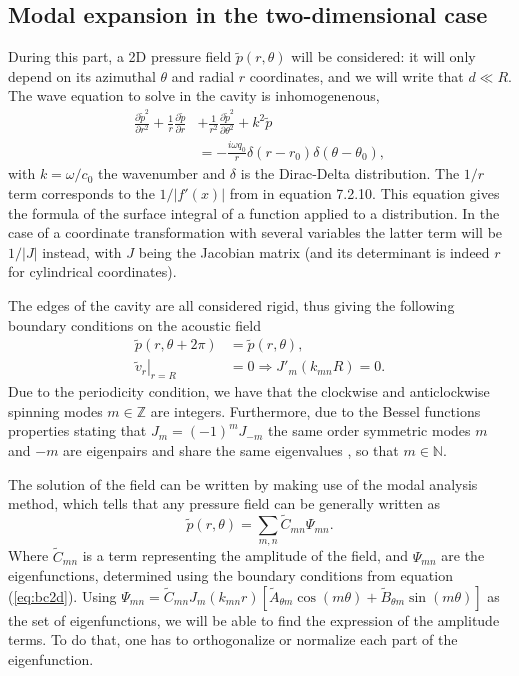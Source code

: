 \documentclass[%
 reprint,
 amsmath,amssymb,
 aps,
]{revtex4-2}
\begin{document}
\subsection{Modal expansion in the two-dimensional case}
During this part, a 2D pressure field $\tilde{p}(r, \theta)$ will be considered: it will only depend on its azimuthal $\theta$ and radial $r$ coordinates, and we will write that $d \ll R$. The wave equation to solve in the cavity is inhomogenenous,
\begin{equation}
    \begin{split}
        \frac{\partial \tilde{p}^2}{\partial r^2} + \frac{1}{r} \frac{\partial \tilde{p}}{\partial r} &+ \frac{1}{r^2} \frac{\partial \tilde{p}^2}{\partial \theta^2} + k^2 \tilde{p}\\ &= -\frac{i \omega q_0}{r} \delta(r - r_0) \delta(\theta - \theta_0),
    \end{split} \label{eq:2dwaveq}
\end{equation}
with $k = \omega/c_0$ the wavenumber and $\delta$ is the Dirac-Delta distribution. The $1/r$ term corresponds to the $1/|f'(x)|$ from \cite{friedlander} in equation 7.2.10. This equation gives the formula of the surface integral of a function applied to a distribution. In the case of a coordinate transformation with several variables the latter term will be $1/|J|$ instead, with $J$ being the Jacobian matrix (and its determinant is indeed $r$ for cylindrical coordinates). 

The edges of the cavity are all considered rigid, thus giving the following boundary conditions on the acoustic field
\begin{equation}
   \begin{split}
       \tilde{p}(r, \theta + 2 \pi) &= \tilde{p}(r, \theta),\\
               \left. \tilde{v}_r \right|_{r=R} & = 0 \Rightarrow J'_m (k_{mn}R) = 0.
   \end{split} \label{eq:bc2d}
\end{equation}
Due to the periodicity condition, we have that the clockwise and anticlockwise spinning modes $m \in \mathbb{Z}$ are integers. Furthermore, due to the Bessel functions properties stating that $J_m = (-1)^m J_{-m}$ the same order symmetric modes $m$ and $-m$ are eigenpairs and share the same eigenvalues \cite{rona2007}, so that $m \in \mathbb{N}$.

The solution of the field can be written by making use of the modal analysis method, which tells that any pressure field can be generally written as 
\begin{equation}
    \tilde{p}(r, \theta) = \sum_{m,n} \tilde{C}_{mn} \Psi_{mn}.
\end{equation}
Where $\tilde{C}_{mn}$ is a term representing the amplitude of the field, and $\Psi_{mn}$ are the eigenfunctions, determined using the boundary conditions from equation (\ref{eq:bc2d}). Using $\Psi_{mn} = \tilde{C}_{mn} J_m (k_{mn}r)\left[ \tilde{A}_{\theta m} \cos(m \theta) + \tilde{B}_{\theta m} \sin(m \theta) \right]$ as the set of eigenfunctions, we will be able to find the expression of the amplitude terms. To do that, one has to orthogonalize or normalize each part of the eigenfunction.
\end{document}
